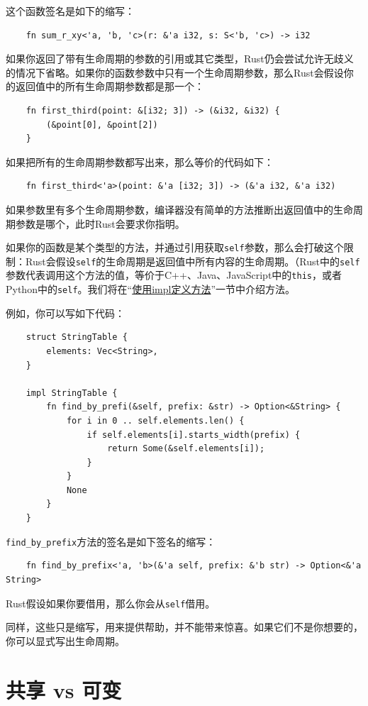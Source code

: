 这个函数签名是如下的缩写：
\begin{verbatim}
    fn sum_r_xy<'a, 'b, 'c>(r: &'a i32, s: S<'b, 'c>) -> i32
\end{verbatim}

如果你返回了带有生命周期的参数的引用或其它类型，Rust仍会尝试允许无歧义的情况下省略。如果你的函数参数中只有一个生命周期参数，那么Rust会假设你的返回值中的所有生命周期参数都是那一个：
\begin{verbatim}
    fn first_third(point: &[i32; 3]) -> (&i32, &i32) {
        (&point[0], &point[2])
    }
\end{verbatim}

如果把所有的生命周期参数都写出来，那么等价的代码如下：
\begin{verbatim}
    fn first_third<'a>(point: &'a [i32; 3]) -> (&'a i32, &'a i32)
\end{verbatim}

如果参数里有多个生命周期参数，编译器没有简单的方法推断出返回值中的生命周期参数是哪个，此时Rust会要求你指明。

如果你的函数是某个类型的方法，并通过引用获取\texttt{self}参数，那么会打破这个限制：Rust会假设\texttt{self}的生命周期是返回值中所有内容的生命周期。（Rust中的\texttt{self}参数代表调用这个方法的值，等价于C++、Java、JavaScript中的\texttt{this}，或者Python中的\texttt{self}。我们将在“\hyperref[method]{使用impl定义方法}”一节中介绍方法。

例如，你可以写如下代码：
\begin{verbatim}
    struct StringTable {
        elements: Vec<String>,
    }

    impl StringTable {
        fn find_by_prefi(&self, prefix: &str) -> Option<&String> {
            for i in 0 .. self.elements.len() {
                if self.elements[i].starts_width(prefix) {
                    return Some(&self.elements[i]);
                }
            }
            None
        }
    }
\end{verbatim}

\texttt{find\_by\_prefix}方法的签名是如下签名的缩写：
\begin{verbatim}
    fn find_by_prefix<'a, 'b>(&'a self, prefix: &'b str) -> Option<&'a String>
\end{verbatim}
Rust假设如果你要借用，那么你会从\texttt{self}借用。

同样，这些只是缩写，用来提供帮助，并不能带来惊喜。如果它们不是你想要的，你可以显式写出生命周期。

\section{共享 vs 可变}

